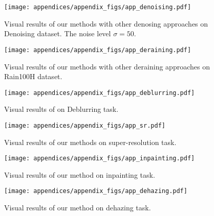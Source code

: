\documentclass{article}
\theoremstyle{plain}
\theoremstyle{definition}
\theoremstyle{remark}
\begin{document}
\begin{figure}[ht]
\begin{center}
\centerline{\texttt{[image: appendices/appendix\_figs/app\_denoising.pdf]}}\vspace{-2.0mm}
\caption{Visual results of our methods with other denosing approaches on Denoising dataset. The noise level $\sigma=50$.}
\label{app-fig:denosing_results}
\end{center}
\vskip -0.2in
\end{figure}

\begin{figure}[ht]
\begin{center}
\centerline{\texttt{[image: appendices/appendix\_figs/app\_deraining.pdf]}}\vspace{-2.0mm}
\caption{Visual results of our methods with other deraining approaches on Rain100H dataset.}
\label{app-fig:deraining_results}
\end{center}
\vskip -0.2in
\end{figure}

\begin{figure}[ht]
\begin{center}
\centerline{\texttt{[image: appendices/appendix\_figs/app\_deblurring.pdf]}}\vspace{-2.0mm}
\caption{Visual results of on Deblurring task.}
\label{app-fig:deblurring_results}
\end{center}
\vskip -0.2in
\end{figure}

\begin{figure}[ht]
\begin{center}
\centerline{\texttt{[image: appendices/appendix\_figs/app\_sr.pdf]}}\vspace{-2.0mm}
\caption{Visual results of our methods on super-resolution task.}
\label{app-fig:sr_results}
\end{center}
\vskip -0.2in
\end{figure}

\begin{figure}[ht]
\begin{center}
\centerline{\texttt{[image: appendices/appendix\_figs/app\_inpainting.pdf]}}\vspace{-2.0mm}
\caption{Visual results of our method on inpainting task.}
\label{app-fig:inpainting_results}
\end{center}
\vskip -0.2in
\end{figure}

\begin{figure}[ht]
\begin{center}
\centerline{\texttt{[image: appendices/appendix\_figs/app\_dehazing.pdf]}}\vspace{-2.0mm}
\caption{Visual results of our method on dehazing task.}
\label{app-fig:dehazing_results}
\end{center}
\vskip -0.2in
\end{figure}




 
\end{document}

